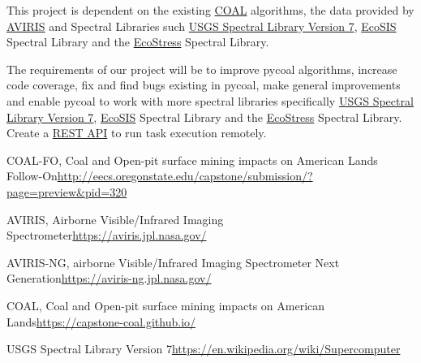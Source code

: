 \documentclass[a4paper,12pt]{article}
\begin{document}
\noindent This project is dependent on the existing \href{https://capstone-coal.github.io/}{COAL} algorithms, the data provided by \href{https://aviris.jpl.nasa.gov/}{AVIRIS} and Spectral Libraries such \href{https://speclab.cr.usgs.gov/spectral-lib.html}{USGS Spectral Library Version 7}, \href{https://ecosis.org/}{EcoSIS} Spectral Library and the \href{https://speclib.jpl.nasa.gov/}{EcoStress} Spectral Library.\newline


\newline


\noindent  The requirements of our project will be to improve pycoal algorithms, increase code coverage, fix and find bugs existing in pycoal, make general improvements and enable pycoal to work with more spectral libraries specifically \href{https://speclab.cr.usgs.gov/spectral-lib.html}{USGS Spectral Library Version 7}, \href{https://ecosis.org/}{EcoSIS} Spectral Library and the \href{https://speclib.jpl.nasa.gov/}{EcoStress} Spectral Library. Create a \href{https://restfulapi.net/}{REST API} to run task execution remotely.\newline

\newline

\noindent [1] COAL-FO, Coal and Open-pit surface mining impacts on American Lands Follow-On\newline \url{http://eecs.oregonstate.edu/capstone/submission/?page=preview\&pid=320} \newline

\noindent [2] AVIRIS, Airborne Visible/Infrared Imaging Spectrometer\newline \url{https://aviris.jpl.nasa.gov/} \newline

\noindent [3] AVIRIS-NG, airborne Visible/Infrared Imaging Spectrometer Next Generation\newline \url{https://aviris-ng.jpl.nasa.gov/}\newline

\noindent [4] COAL, Coal and Open-pit surface mining impacts on American Lands\newline \url{https://capstone-coal.github.io/} \newline

\noindent [5] USGS Spectral Library Version 7\newline \url{https://en.wikipedia.org/wiki/Supercomputer}\newline
\end{document}
